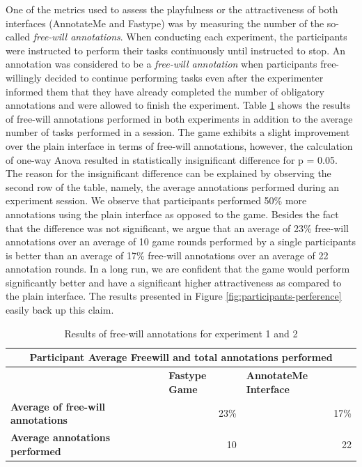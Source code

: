 One of the metrics used to assess the playfulness or the attractiveness of both interfaces (AnnotateMe and Fastype) was by measuring the number of the so-called \textit{free-will annotations}. When conducting each experiment, the participants were instructed to perform their tasks continuously until instructed to stop. An annotation was considered to be a \textit{free-will annotation} when participants free-willingly decided to continue performing tasks even after the experimenter informed them that they have already completed the number of obligatory annotations and were allowed to finish the experiment. Table \ref{tab:free-will-annotation-res} shows the results of free-will annotations performed in both experiments in addition to the average number of tasks performed in a session. The game exhibits a slight improvement over the plain interface in terms of free-will annotations, however, the calculation of one-way Anova resulted in statistically insignificant difference for p = 0.05. The reason for the insignificant difference can be explained by observing the second row of the table, namely, the average annotations performed during an experiment session. We observe that participants performed 50\% more annotations using the plain interface as opposed to the game. Besides the fact that the difference was not significant, we argue that an average of 23\% free-will annotations over an average of 10 game rounds performed by a single participants is better than an average of 17\% free-will annotations over an average of 22 annotation rounds. In a long run, we are confident that the game would perform significantly better and have a significant higher attractiveness as compared to the plain interface. The results presented in Figure \ref{fig:participants-perference} easily back up this claim. 

\begin{table}[htbp]
  \centering
  \caption{Results of free-will annotations for experiment 1 and 2}
    \begin{tabular}{|l|r|r|}
    \toprule
    \multicolumn{3}{|c|}{\textbf{Participant Average Freewill and total annotations performed}} \\
    \midrule
          & \multicolumn{1}{l|}{\textbf{Fastype Game}} & \multicolumn{1}{l|}{\textbf{AnnotateMe Interface}} \\
    \midrule
    \textbf{Average of free-will annotations} & 23\%    & 17\% \\
    \midrule
    \textbf{Average annotations performed} & 10    & 22 \\
    \bottomrule
    \end{tabular}%
  \label{tab:free-will-annotation-res}%
\end{table}%


